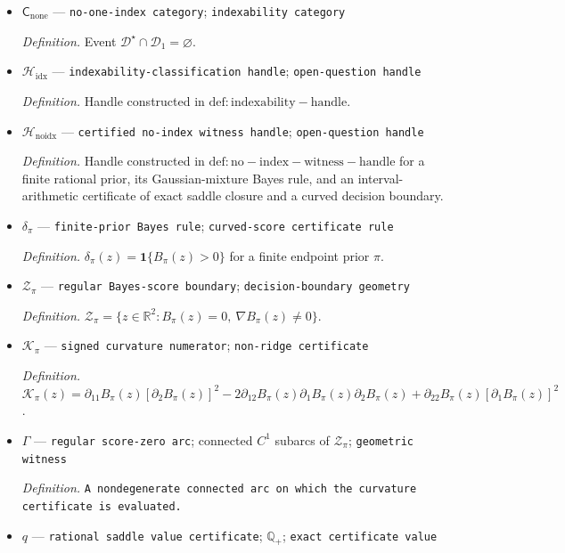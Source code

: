 \documentclass{article}
\begin{document}
\begin{itemize}
  \item \(\mathsf C_{\mathrm{none}}\) --- \texttt{no-\allowbreak{}one-\allowbreak{}index category}; \texttt{indexability category}
  \par\smallskip\noindent\emph{Definition.} Event \(\mathcal D^{\star}\cap\mathcal D_1=\varnothing\).
  \item \(\mathscr H_{\mathrm{idx}}\) --- \texttt{indexability-\allowbreak{}classification handle}; \texttt{open-\allowbreak{}question handle}
  \par\smallskip\noindent\emph{Definition.} Handle constructed in \(\mathrm{def:indexability-handle}\).
  \item \(\mathscr H_{\mathrm{noidx}}\) --- \texttt{certified no-\allowbreak{}index witness handle}; \texttt{open-\allowbreak{}question handle}
  \par\smallskip\noindent\emph{Definition.} Handle constructed in \(\mathrm{def:no-index-witness-handle}\) for a finite rational prior, its Gaussian-mixture Bayes rule, and an interval-arithmetic certificate of exact saddle closure and a curved decision boundary.
  \item \(\delta_{\pi}\) --- \texttt{finite-\allowbreak{}prior Bayes rule}; \texttt{curved-\allowbreak{}score certificate rule}
  \par\smallskip\noindent\emph{Definition.} \(\delta_{\pi}(z)=\mathbf 1\{B_{\pi}(z)>0\}\) for a finite endpoint prior \(\pi\).
  \item \(\mathcal Z_{\pi}\) --- \texttt{regular Bayes-\allowbreak{}score boundary}; \texttt{decision-\allowbreak{}boundary geometry}
  \par\smallskip\noindent\emph{Definition.} \(\mathcal Z_{\pi}=\{z\in\mathbb R^2:B_{\pi}(z)=0,\ \nabla B_{\pi}(z)\ne0\}\).
  \item \(\mathcal K_{\pi}\) --- \texttt{signed curvature numerator}; \texttt{non-\allowbreak{}ridge certificate}
  \par\smallskip\noindent\emph{Definition.} \(\mathcal K_{\pi}(z)=\partial_{11}B_{\pi}(z)[\partial_2B_{\pi}(z)]^2-2\partial_{12}B_{\pi}(z)\partial_1B_{\pi}(z)\partial_2B_{\pi}(z)+\partial_{22}B_{\pi}(z)[\partial_1B_{\pi}(z)]^2\).
  \item \(\Gamma\) --- \texttt{regular score-\allowbreak{}zero arc}; connected \(C^1\) subarcs of \(\mathcal Z_{\pi}\); \texttt{geometric witness}
  \par\smallskip\noindent\emph{Definition.} \texttt{A nondegenerate connected arc on which the curvature certificate is evaluated.}
  \item \(q\) --- \texttt{rational saddle value certificate}; \(\mathbb Q_{+}\); \texttt{exact certificate value}

\end{itemize}
\end{document}
